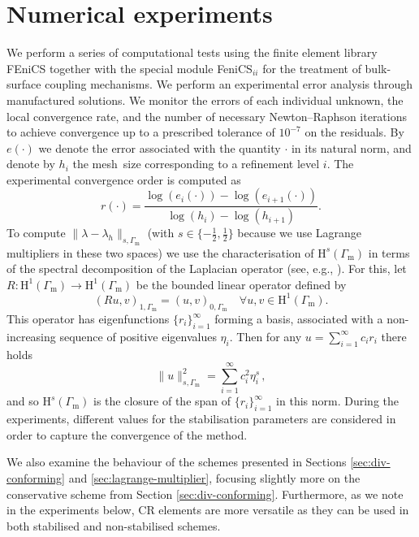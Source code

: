 \documentclass[onefignum,onetabnum,reqno,a4paper,final]{siamart250211}
\newcommand\0{\mathbf{0}}
\renewcommand\H{\mathrm{H}}
\newcommand\Gm{\Gamma_{\mathrm{m}}}
\numberwithin{figure}{section}
\numberwithin{table}{section}
\begin{document}
	\section{Numerical experiments}\label{sec:experiments}
	We perform a series of computational tests using the finite element library FEniCS \cite{AlnaesEtal2015} together with the special module FeniCS$_{ii}$ \cite{kuchta2020assembly} for the treatment of bulk-surface coupling mechanisms. 
 We perform an experimental error analysis through manufactured solutions. We monitor the errors of each individual unknown, the local convergence rate, and the number of necessary Newton--Raphson iterations to achieve convergence up to a prescribed tolerance of $10^{-7}$ on the residuals. 
	By $e(\cdot)$ we  denote the error associated with the quantity $\cdot$ in its natural norm, and denote by $h_i$ the mesh~size corresponding to a refinement level $i$. The experimental convergence order is computed as
	\[r(\cdot) = \frac{\log(e_i(\cdot))- \log(e_{i+1}(\cdot))}{\log(h_i)- \log(h_{i+1})}.\]
	To compute $\|\lambda-\lambda_h\|_{s,\Gm}$ (with $s \in \{-\frac{1}{2}, \frac{1}{2}\}$ because we  use Lagrange multipliers in these two spaces) we use the characterisation of $\H^{s}(\Gm)$
		in terms of the spectral decomposition of the Laplacian operator (see, e.g., \cite{kuchta2020assembly}). 
		For this, let $R : \H^1(\Gm) \rightarrow \H^1(\Gm)$ be the bounded linear operator defined by  
		\[ 
		(Ru,v)_{1,\Gm} = (u,v)_{0,\Gm} \quad \forall u,  v\in \H^1(\Gm).
		\]
		This operator has eigenfunctions $\{r_i\}_{i=1}^\infty$ forming a basis, associated with a non-increasing sequence of positive eigenvalues $\eta_i$. Then for any 
		$u = \sum_{i=1}^\infty c_i r_i$ there holds
		\[ 
		\|u\|_{s,\Gm}^2 = \sum_{i=1}^\infty c_i^2 \eta_i^{s}\,,
		\] 
		and so $\H^{s}(\Gm)$ is the closure of the span of   $\{r_i\}_{i=1}^\infty$ 
		in this norm. 
	During the experiments, different values for the stabilisation parameters are considered in order to capture the convergence of the method. 	

   We also examine the behaviour of the schemes presented in Sections \ref{sec:div-conforming} and \ref{sec:lagrange-multiplier}, focusing slightly more on the conservative scheme from  Section \ref{sec:div-conforming}. Furthermore, as we note in the experiments below,  CR elements are more versatile as they can be used in both stabilised and non-stabilised schemes. %
    
	
\end{document}
